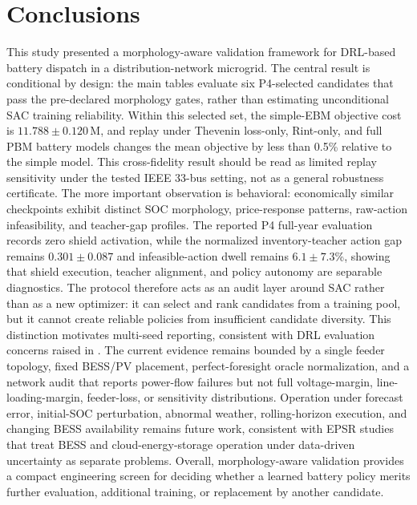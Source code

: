 \section{Conclusions}
\label{sec:conclusion}

This study presented a morphology-aware validation framework for DRL-based battery dispatch in a distribution-network microgrid. The central result is conditional by design: the main tables evaluate six P4-selected candidates that pass the pre-declared morphology gates, rather than estimating unconditional SAC training reliability. Within this selected set, the simple-EBM objective cost is $11.788 \pm 0.120$\,M\textyen{}, and replay under Thevenin loss-only, Rint-only, and full PBM battery models changes the mean objective by less than 0.5\% relative to the simple model. This cross-fidelity result should be read as limited replay sensitivity under the tested IEEE 33-bus setting, not as a general robustness certificate. The more important observation is behavioral: economically similar checkpoints exhibit distinct SOC morphology, price-response patterns, raw-action infeasibility, and teacher-gap profiles. The reported P4 full-year evaluation records zero shield activation, while the normalized inventory-teacher action gap remains $0.301 \pm 0.087$ and infeasible-action dwell remains $6.1 \pm 7.3$\%, showing that shield execution, teacher alignment, and policy autonomy are separable diagnostics. The protocol therefore acts as an audit layer around SAC rather than as a new optimizer: it can select and rank candidates from a training pool, but it cannot create reliable policies from insufficient candidate diversity. This distinction motivates multi-seed reporting, consistent with DRL evaluation concerns raised in \cite{agarwal2021statistical}. The current evidence remains bounded by a single feeder topology, fixed BESS/PV placement, perfect-foresight oracle normalization, and a network audit that reports power-flow failures but not full voltage-margin, line-loading-margin, feeder-loss, or sensitivity distributions. Operation under forecast error, initial-SOC perturbation, abnormal weather, rolling-horizon execution, and changing BESS availability remains future work, consistent with EPSR studies that treat BESS and cloud-energy-storage operation under data-driven uncertainty as separate problems\cite{parvar2022epsrDRO,saini2024epsrUncertainty}. Overall, morphology-aware validation provides a compact engineering screen for deciding whether a learned battery policy merits further evaluation, additional training, or replacement by another candidate.
